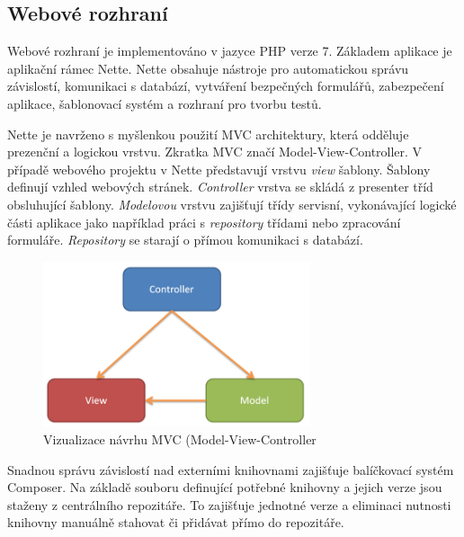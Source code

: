 \documentclass[thesis=B,czech]{FITthesis}[2012/06/26]
\begin{document}
\subsection{Webové rozhraní}
Webové rozhraní je implementováno v jazyce PHP verze 7. Základem aplikace je aplikační rámec Nette\cite{nette}. Nette
obsahuje nástroje pro automatickou správu závislostí, komunikaci s databází, vytváření bezpečných formulářů, zabezpečení
aplikace, šablonovací systém a rozhraní pro tvorbu testů. 
\par
Nette je navrženo s myšlenkou použití MVC architektury, která odděluje
prezenční a logickou vrstvu. Zkratka MVC značí Model-View-Controller. V případě webového projektu v Nette představují vrstvu \textit{view} šablony.
Šablony definují vzhled webových stránek. \textit{Controller} vrstva se skládá z presenter tříd obsluhující šablony. \textit{Modelovou} vrstvu  zajišťují třídy servisní, vykonávající logické části aplikace jako 
například práci s \textit{repository} třídami nebo zpracování formuláře. \textit{Repository} se starají o přímou komunikaci s databází.

\begin{figure}[h]\centering
 	\includegraphics[width=0.7\textwidth]{resources/mvc}
	\caption[MVC]{Vizualizace návrhu MVC (Model-View-Controller}\label{fig:mvc}
\end{figure}
\par
Snadnou správu závislostí nad externími knihovnami zajišťuje balíčkovací systém Composer\cite{composer}. 
Na základě souboru definující potřebné knihovny a jejich verze jsou staženy z centrálního repozitáře. To zajišťuje jednotné verze
a eliminaci nutnosti knihovny manuálně stahovat či přidávat přímo do repozitáře.
\end{document}

